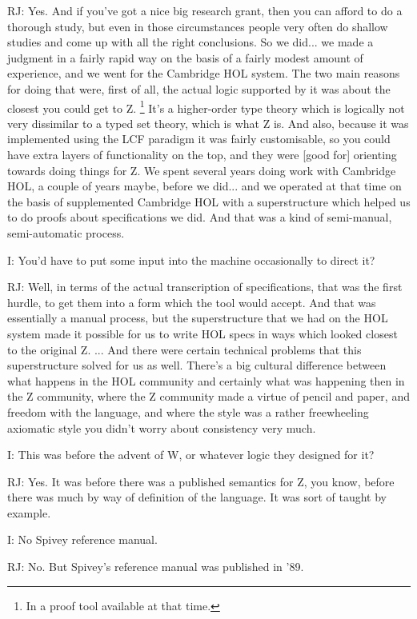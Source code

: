 \documentclass[10pt,titlepage]{book}
\begin{document}
RJ: Yes.
And if you've got a nice big research grant, then you can afford to do a thorough study, but even in those circumstances people very often do shallow studies and come up with all the right conclusions.
So we did... we made a judgment in a fairly rapid way on the basis of a fairly modest amount of experience, and we went for the Cambridge HOL system.
The two main reasons for doing that were, first of all, the actual logic supported by it was about the closest you could get to Z.%
\footnote{In a proof tool available at that time.}%
It's a higher-order type theory which is logically not very dissimilar to a typed set theory, which is what Z is.
And also, because it was implemented using the LCF paradigm it was fairly customisable, so you could have extra layers of functionality on the top, and they were [good for] orienting towards doing things for Z.
We spent several years doing work with Cambridge HOL, a couple of years maybe, before we did... and we operated at that time on the basis of supplemented Cambridge HOL with a superstructure which helped us to do proofs about specifications we did. And that was a kind of semi-manual, semi-automatic process.

I: You'd have to put some input into the machine occasionally to direct it?

RJ: Well, in terms of the actual transcription of specifications, that was the first hurdle, to get them into a form which the tool would accept.
And that was essentially a manual process, but the superstructure that we had on the HOL system made it possible for us to write HOL specs in ways which looked closest to the original Z.
... 
And there were certain technical problems that this superstructure solved for us as well.
There's a big cultural difference between what happens in the HOL community and certainly what was happening then in the Z community, where the Z community made a virtue of pencil and paper, and freedom with the language, and where the style was a rather freewheeling axiomatic style you didn't worry about consistency very much.

I: This was before the advent of W, or whatever logic they designed for it?

RJ: Yes.
It was before there was a published semantics for Z, you know, before there was much by way of definition of the language.
It was sort of taught by example.

I: No Spivey reference manual.

RJ: No. But Spivey's reference manual was published in '89.
\end{document}
